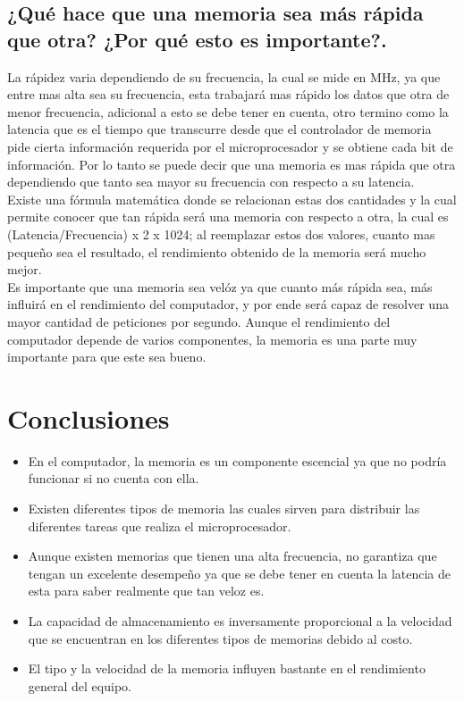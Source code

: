 \documentclass{article}
\begin{document}
\subsection{\textbf{¿Qué hace que una memoria sea más rápida que otra? ¿Por qué esto es importante?.}}
La rápidez varia dependiendo de su frecuencia, la cual se mide en MHz, ya que entre mas alta sea su frecuencia, esta trabajará mas rápido los datos que otra de menor frecuencia, adicional a esto se debe tener en cuenta, otro termino como la latencia que es el tiempo que transcurre desde que el controlador de memoria pide cierta información requerida por el microprocesador y se obtiene cada bit de información. Por lo tanto se puede decir que una memoria es mas rápida que otra dependiendo que tanto sea mayor su frecuencia con respecto a su latencia.\cite{hardzone}\\
Existe una fórmula matemática donde se relacionan estas dos cantidades y la cual permite conocer que tan rápida será una memoria con respecto a otra, la cual es (Latencia/Frecuencia) x 2 x 1024; \cite{computer} al reemplazar estos dos valores, cuanto mas pequeño sea el resultado, el rendimiento obtenido de la memoria será mucho mejor.\\
Es importante que una memoria sea velóz ya que cuanto más rápida sea, más influirá en el rendimiento del computador, y por ende será capaz de resolver una mayor cantidad de peticiones por segundo. Aunque el rendimiento del computador depende de varios componentes, la memoria es una parte muy importante para que este sea bueno. \cite{computer}

\newpage    

\section{Conclusiones} \label{conclusion}

\begin{itemize}
    \item En el computador, la memoria es un componente escencial ya que no podría funcionar si no cuenta con ella.
    \item Existen diferentes tipos de memoria las cuales sirven para distribuir las diferentes tareas que realiza el microprocesador.
    \item Aunque existen memorias que tienen una alta frecuencia, no garantiza que tengan un excelente desempeño ya que se debe tener en cuenta la latencia de esta para saber realmente que tan veloz es.
    \item La capacidad de almacenamiento es inversamente proporcional a la velocidad que se encuentran en los diferentes tipos de memorias debido al costo.
    \item El tipo y la velocidad de la memoria influyen bastante en el rendimiento general del equipo.
    
\end{itemize}



\end{document}
